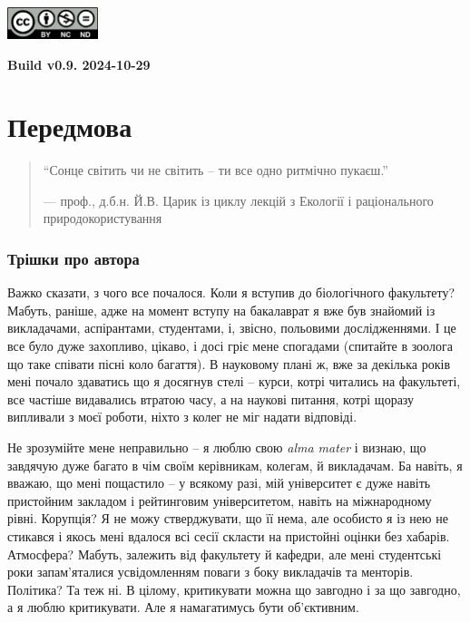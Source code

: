 \documentclass[
  11pt,
]{book}
\begin{document}
\href{https://creativecommons.org/licenses/by-nc-nd/4.0/deed.en}{\includegraphics[width=1.04167in,height=\textheight]{images/by-nc-nd.png}}

\textbf{Build v0.9. 2024-10-29}

\chapter*{Передмова}\label{ux43fux435ux440ux435ux434ux43cux43eux432ux430}

\begin{quote}
``Сонце світить чи не світить --
ти все одно ритмічно пукаєш.''

--- проф., д.б.н. Й.В. Царик із циклу лекцій з Екології і раціонального природокористування
\end{quote}

\subsection{Трішки про автора}\label{about-author}

Важко сказати, з чого все почалося. Коли я вступив до біологічного факультету? Мабуть, раніше, адже на момент вступу на бакалаврат я вже був знайомий із викладачами, аспірантами, студентами, і, звісно, польовими дослідженнями. І це все було дуже захопливо, цікаво, і досі гріє мене спогадами (спитайте в зоолога що таке співати пісні коло багаття). В науковому плані ж, вже за декілька років мені почало здаватись що я досягнув стелі -- курси, котрі читались на факультеті, все частіше видавались втратою часу, а на наукові питання, котрі щоразу випливали з моєї роботи, ніхто з колег не міг надати відповіді.

Не зрозумійте мене неправильно -- я люблю свою \emph{alma mater} і визнаю, що завдячую дуже багато в чім своїм керівникам, колегам, й викладачам. Ба навіть, я вважаю, що мені пощастило -- у всякому разі, мій університет є дуже навіть пристойним закладом і рейтинговим університетом, навіть на міжнародному рівні. Корупція? Я не можу стверджувати, що її нема, але особисто я із нею не стикався і якось мені вдалося всі сесії скласти на пристойні оцінки без хабарів. Атмосфера? Мабуть, залежить від факультету й кафедри, але мені студентські роки запам'яталися усвідомленням поваги з боку викладачів та менторів. Політика? Та теж ні. В цілому, критикувати можна що завгодно і за що завгодно, а я люблю критикувати. Але я намагатимусь бути об'єктивним.
\end{document}
